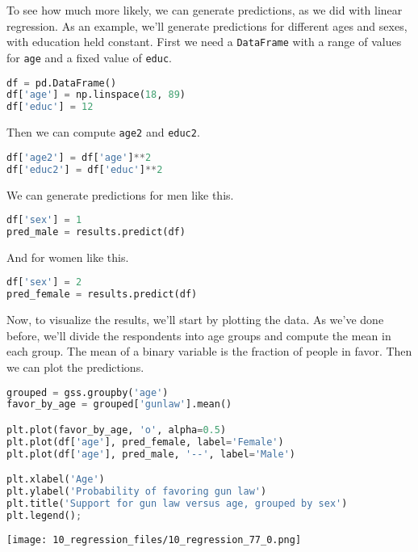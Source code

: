 To see how much more likely, we can generate predictions, as we did with
linear regression. As an example, we'll generate predictions for
different ages and sexes, with education held constant. First we need a
\passthrough{\lstinline!DataFrame!} with a range of values for
\passthrough{\lstinline!age!} and a fixed value of
\passthrough{\lstinline!educ!}.

\begin{lstlisting}[language=Python,style=source]
df = pd.DataFrame()
df['age'] = np.linspace(18, 89)
df['educ'] = 12
\end{lstlisting}

Then we can compute \passthrough{\lstinline!age2!} and
\passthrough{\lstinline!educ2!}.

\begin{lstlisting}[language=Python,style=source]
df['age2'] = df['age']**2
df['educ2'] = df['educ']**2
\end{lstlisting}

We can generate predictions for men like this.

\begin{lstlisting}[language=Python,style=source]
df['sex'] = 1
pred_male = results.predict(df)
\end{lstlisting}

And for women like this.

\begin{lstlisting}[language=Python,style=source]
df['sex'] = 2
pred_female = results.predict(df)
\end{lstlisting}

Now, to visualize the results, we'll start by plotting the data. As
we've done before, we'll divide the respondents into age groups and
compute the mean in each group. The mean of a binary variable is the
fraction of people in favor. Then we can plot the predictions.

\begin{lstlisting}[language=Python,style=source]
grouped = gss.groupby('age')
favor_by_age = grouped['gunlaw'].mean()

plt.plot(favor_by_age, 'o', alpha=0.5)
plt.plot(df['age'], pred_female, label='Female')
plt.plot(df['age'], pred_male, '--', label='Male')

plt.xlabel('Age')
plt.ylabel('Probability of favoring gun law')
plt.title('Support for gun law versus age, grouped by sex')
plt.legend();
\end{lstlisting}

\begin{center}
\texttt{[image: 10\_regression\_files/10\_regression\_77\_0.png]}
\end{center}

